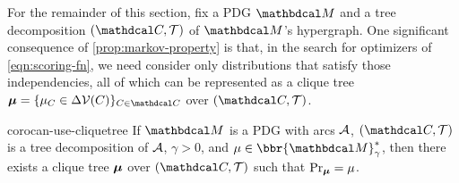 \documentclass{article}
\begin{document}
For the remainder of this section, fix a PDG $\dg M$ and a tree decomposition $(\C, \mathcal T)$ of $\dg M$'s hypergraph.
One significant consequence of \cref{prop:markov-property} is that, in the
search for optimizers of \eqref{eqn:scoring-fn}, we
need consider only distributions that satisfy those independencies,
all of which can be represented as a clique tree
$\bmu = \{\mu_C \in \Delta\V(C) \}_{C \in \C}$
over $(\C, \mathcal T)$.

\begin{linked}{coro}{can-use-cliquetree}
    If $\dg M$ is a PDG with arcs $\mathcal A$, 
    $(\C, \mathcal T)$ is a tree decomposition of $\mathcal A$,
    $\gamma > 0$, and
    $\mu \in \bbr{\dg M}^*_\gamma$, then there exists a clique tree
    $\boldsymbol\mu$ over $(\C, \mathcal T)$ such that $\Pr_{\boldsymbol\mu} = \mu$.
\end{linked}
\end{document}
